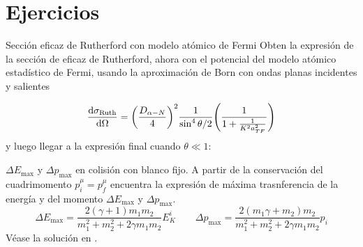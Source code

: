 
\newpage 
\section*{Ejercicios}


\begin{Ejercicio}{Sección eficaz de Rutherford con modelo atómico de Fermi} \label{Ej:02.01}
    Obten la expresión de la sección de eficaz de Rutherford, ahora con el potencial del modelo atómico estadístico de Fermi, usando la aproximación de Born con ondas planas incidentes y salientes

    \begin{equation*}
        \dv{\sigma_{\Ruth}}{\Omega} =  \pqty{\frac{D_{\alpha-N}}{4}}^2 \frac{1}{\sin^4 \theta/2} \pqty{\frac{1}{1+\frac{1}{K^2 a_{TF}^2}}}
    \end{equation*}
    y luego llegar a la expresión final cuando $\theta\ll 1$: 
\end{Ejercicio}


\begin{Ejercicio}{$\Delta E_{\max}$ y $\Delta p_{\max}$ en colisión con blanco fijo.} \label{Ej:02.02}
    A partir de la conservación del cuadrimomento $p^{\mu}_i = p^{\mu}_f$ encuentra la expresión de máxima trasnferencia de la energía y del momento $\Delta E_{\max}$ y $\Delta p_{\max}$. 
    \begin{equation}
        \Delta E_{\max} = \frac{2(\gamma+1)m_1m_2}{m_1^2 + m_2^2 + 2 \gamma m_1 m_2} E_K^i \qquad 
        \Delta p_{\max} = \frac{2(m_1\gamma+m_2)m_2}{m_1^2 + m_2^2 + 2 \gamma m_1 m_2} p_i 
    \end{equation}
    Véase la solución en \cite{Montaruli201x_Exercise4}.
\end{Ejercicio}

